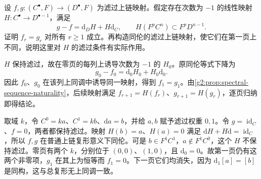 \begin{exercise}\label{g2:ex:filtered-homotopy-pages}
	设 \(f,g:(C^\bullet,F)\to(D^\bullet,F)\) 为滤过上链映射。假定存在次数为 \(-1\) 的线性映射 \(H:C^\bullet\to D^{\bullet-1}\)，满足
	\[
		g-f=\mathrm d_DH+H\mathrm d_C,\qquad H(F^pC^n)\subset F^pD^{n-1}.
	\]
	证明 \(f_r=g_r\) 对所有 \(r\ge1\) 成立。再构造同伦的滤过上链映射，使它们在第一页上不同，说明这里对 \(H\) 的滤过条件有实际作用。
\end{exercise}
\begin{solution}
	\(H\) 保持滤过，故在零页的每列上诱导次数为 \(-1\) 的 \(H_0\)。原同伦等式下降为
	\[
		g_0-f_0=\mathrm d_0H_0+H_0\mathrm d_0.
	\]
	因此 \(f_0\)、\(g_0\) 在该列上同调中诱导同一映射，得到 \(f_1=g_1\)。由\cref{g2:prop:spectral-sequence-naturality}，后续映射满足 \(f_{r+1}=H(f_r)\)、\(g_{r+1}=H(g_r)\)，逐页归纳即得结论。

	取域 \(k\)，令 \(C^0=ka\)、\(C^1=kb\)、\(\mathrm da=b\)，并给 \(a,b\) 赋予滤过权重 \(0,1\)。令 \(g=\operatorname{id}_C\)、\(f=0\)，两者都保持滤过。映射 \(H(b)=a\)、\(H(a)=0\) 满足 \(\mathrm dH+H\mathrm d=\operatorname{id}_C\)，所以 \(f,g\) 在普通上链复形意义下同伦。可是 \(b\in F^1C^1\)，\(a\notin F^1C^0\)，这个 \(H\) 不保持滤过。零页有两个 \(k\)，分别位于 \((0,0)\)、\((1,0)\)，且 \(\mathrm d_0=0\)。故第一页仍有这两个非零项，\(g_1\) 在其上为恒等而 \(f_1=0\)。下一页它们均消失，因为 \(\mathrm d_1[a]=[b]\) 是同构，这与总复形无上同调一致。
\end{solution}

